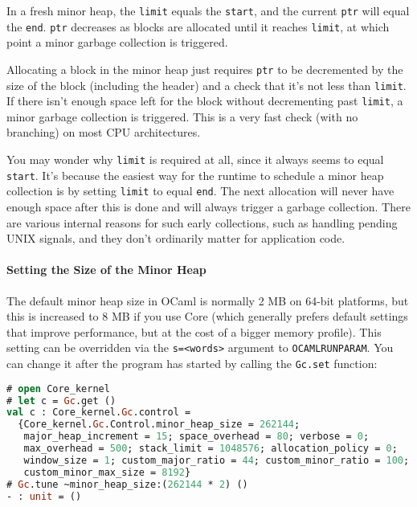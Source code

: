 In a fresh minor heap, the \passthrough{\lstinline!limit!} equals the
\passthrough{\lstinline!start!}, and the current
\passthrough{\lstinline!ptr!} will equal the
\passthrough{\lstinline!end!}. \passthrough{\lstinline!ptr!} decreases
as blocks are allocated until it reaches
\passthrough{\lstinline!limit!}, at which point a minor garbage
collection is triggered.

Allocating a block in the minor heap just requires
\passthrough{\lstinline!ptr!} to be decremented by the size of the block
(including the header) and a check that it's not less than
\passthrough{\lstinline!limit!}. If there isn't enough space left for
the block without decrementing past \passthrough{\lstinline!limit!}, a
minor garbage collection is triggered. This is a very fast check (with
no branching) on most CPU architectures.

You may wonder why \passthrough{\lstinline!limit!} is required at all,
since it always seems to equal \passthrough{\lstinline!start!}. It's
because the easiest way for the runtime to schedule a minor heap
collection is by setting \passthrough{\lstinline!limit!} to equal
\passthrough{\lstinline!end!}. The next allocation will never have
enough space after this is done and will always trigger a garbage
collection. There are various internal reasons for such early
collections, such as handling pending UNIX signals, and they don't
ordinarily matter for application code.

\hypertarget{setting-the-size-of-the-minor-heap}{%
\paragraph{Setting the Size of the Minor
Heap}\label{setting-the-size-of-the-minor-heap}}

The default minor heap size in OCaml is normally 2 MB on 64-bit
platforms, but this is increased to 8 MB if you use Core (which
generally prefers default settings that improve performance, but at the
cost of a bigger memory profile). This setting can be overridden via the
\passthrough{\lstinline!s=<words>!} argument to
\passthrough{\lstinline!OCAMLRUNPARAM!}. You can change it after the
program has started by calling the \passthrough{\lstinline!Gc.set!}
function:

\begin{lstlisting}[language=Caml]
# open Core_kernel
# let c = Gc.get ()
val c : Core_kernel.Gc.control =
  {Core_kernel.Gc.Control.minor_heap_size = 262144;
   major_heap_increment = 15; space_overhead = 80; verbose = 0;
   max_overhead = 500; stack_limit = 1048576; allocation_policy = 0;
   window_size = 1; custom_major_ratio = 44; custom_minor_ratio = 100;
   custom_minor_max_size = 8192}
# Gc.tune ~minor_heap_size:(262144 * 2) ()
- : unit = ()
\end{lstlisting}

